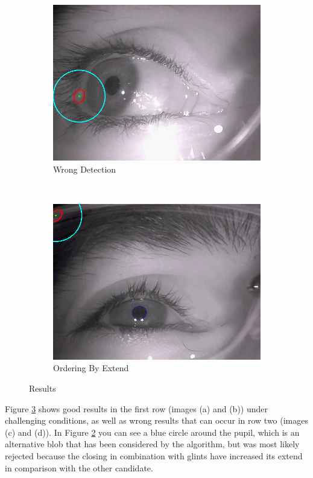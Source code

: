 \begin{figure}[t]
	\begin{subfigure}[b]{0.5\textwidth}
		\centering
		\includegraphics[width=\textwidth]{final/images/wrong1.png}
		\caption{Wrong Detection}
		\label{subfig:wrong1}
	\end{subfigure}%
	~
	\begin{subfigure}[b]{0.5\textwidth}
		\centering
		\includegraphics[width=\textwidth]{final/images/wrong2.png}
		\caption{Ordering By Extend}
		\label{subfig:extend}
	\end{subfigure}
	
	\caption{Results}
	\label{fig:results}
\end{figure}

Figure \ref{fig:results} shows good results in the first row (images (a) and (b)) under challenging conditions, as well as wrong results that can occur in row two (images (c) and (d)). In Figure \ref{subfig:extend} you can see a blue circle around the pupil, which is an alternative blob that has been considered by the algorithm, but was most likely rejected because the closing in combination with glints have increased its extend in comparison with the other candidate.

